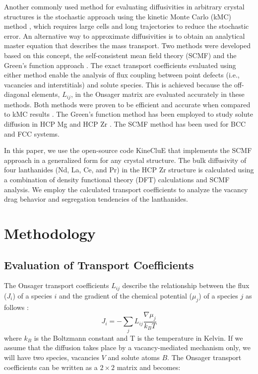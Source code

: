 \documentclass[preprint,12pt]{elsarticle}
\begin{document}
Another commonly used method for evaluating diffusivities in arbitrary crystal structures is the stochastic approach using the kinetic Monte Carlo (kMC) method \cite{murch_simulation_1984, belova_collective_2000}, which requires large cells and long trajectories to reduce the stochastic error. An alternative way to approximate diffusivities is to obtain an analytical master equation that describes the mass transport. Two methods were developed based on this concept, the self-consistent mean field theory (SCMF) \cite{nastar_self-consistent_2000, nastar_mean_2005} and the Green's function approach \cite{trinkle_automatic_2017}. The exact transport coefficients evaluated using either method enable the analysis of flux coupling between point defects (i.e., vacancies and interstitials) and solute species. This is achieved because the off-diagonal elements, $L_{ij}$, in the Onsager matrix are evaluated accurately in these methods. Both methods were proven to be efficient and accurate when compared to kMC results \cite{jain_first-principles_2019, messina_solute_2020}.
The Green's function method has been employed to study solute diffusion in HCP Mg \cite{agarwal_exact_2017} and HCP Zr \cite{jain_first-principles_2019}. The SCMF method has been used for BCC \cite{messina_exact_2014, messina_solute_2020} and FCC \cite{garnier_quantitative_2014, toijer_solute-point_2021} systems.

In this paper, we use the open-source code KineCluE \cite{schuler_kineclue_2020} that implements the SCMF approach in a generalized form for any crystal structure. The bulk diffusivity of four lanthanides (Nd, La, Ce, and Pr) in the HCP Zr structure is calculated using a combination of density functional theory (DFT) calculations and SCMF analysis. We employ the calculated transport coefficients to analyze the vacancy drag behavior and segregation tendencies of the lanthanides.

\section{Methodology}

\subsection{Evaluation of Transport Coefficients}

The Onsager transport coefficients $L_{ij}$ describe the relationship between the flux ($J_i$) of a species $i$ and the gradient of the chemical potential ($\mu_j$) of a species $j$ as follows \cite{allnatt_atomic_2003} :
\begin{equation}
\label{eq_onsager}
    J_i = -\sum_j{L_{ij} \frac{\nabla\mu_j}{k_B T}}
\end{equation}
where $k_B$ is the Boltzmann constant and T is the temperature in Kelvin. If we assume that the diffusion takes place by a vacancy-mediated mechanism only, we will have two species, vacancies $V$ and solute atoms $B$. The Onsager transport coefficients can be written as a $2\times2$ matrix and  becomes:
\end{document}
